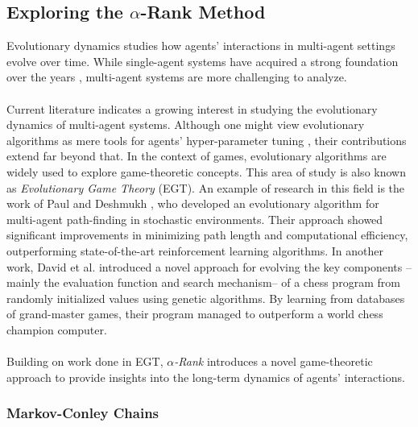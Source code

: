 \subsection{Exploring the \texorpdfstring{$\alpha$}{alpha}-Rank Method}

\begin{flushleft}

    Evolutionary dynamics studies how agents' interactions in multi-agent settings evolve over time. While single-agent systems have acquired a strong foundation over the years \cite{10.5555/2831071.2831085}, multi-agent systems are more challenging to analyze.\\~\\

    Current literature indicates a growing interest in studying the evolutionary dynamics of multi-agent systems. Although one might view evolutionary algorithms as mere tools for agents' hyper-parameter tuning \cite{Sinha_2023}\cite{ganapathy2020studygeneticalgorithmshyperparameter}, their contributions extend far beyond that. In the context of games, evolutionary algorithms are widely used to explore game-theoretic concepts. This area of study is also known as \emph{Evolutionary Game Theory} (EGT). An example of research in this field is the work of Paul and Deshmukh \cite{paul2022multiagentpathfinding}, who developed an evolutionary algorithm for multi-agent path-finding in stochastic environments. Their approach showed significant improvements in minimizing path length and computational efficiency, outperforming state-of-the-art reinforcement learning algorithms. In another work, David et al. \cite{David_2014} introduced a novel approach for evolving the key components --mainly the evaluation function and search mechanism-- of a chess program from randomly initialized values using genetic algorithms. By learning from databases of grand-master games, their program managed to outperform a world chess champion computer.\\~\\
    
    Building on work done in EGT, \emph{$\alpha$-Rank} \cite{omidshafiei2019alpharank} introduces a novel game-theoretic approach to provide insights into the long-term dynamics of agents' interactions. 

    \subsubsection{Markov-Conley Chains}


\end{flushleft}
